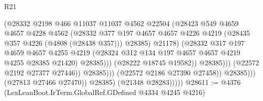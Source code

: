 \begin{lexlean}{R21}
\begin{coremodule}
                                          (@28332
                                            @2198
                                            @466
                                            @11037
                                            @11037
                                            @4562
                                            @22504
                                            (@28423
                                              @549
                                              @4659
                                              @4657
                                              @4228
                                              @4562
                                              (@28332
                                                @377
                                                @197
                                                @4657
                                                @4657
                                                @4226
                                                @4219
                                                (@28435 @357 @4226 (@4808 (@28438 @357)))
                                                @28385)
                                              @21178)
                                            (@28332
                                              @317
                                              @197
                                              @4659
                                              @4657
                                              @4255
                                              @4219
                                              (@28324
                                                @312
                                                @134
                                                @197
                                                @4657
                                                @4657
                                                @4219
                                                @4255
                                                @28385
                                                @21420)
                                              @28385)))
                                        (@28222 @18745 @19582))
                                      @28385)))
                                (@22572 @2192 @27377 @27446))
                              @28385)))
                        (@22572 @2186 @27390 @27458))
                      @28385)))
                (@27813 @27466 @27470))
              @28385)
            (@21348 @28283)))))
@28611 := @4376 (LexLeanBoot.IrTerm.GlobalRef.GDefined @4334 @4245 @4216)

\end{coremodule}
\end{lexlean}
